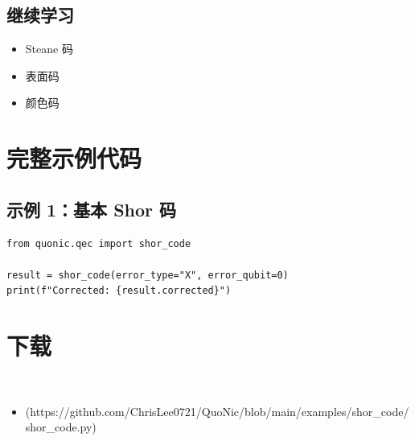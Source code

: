 \documentclass[12pt,a4paper]{article}
\begin{document}
\subsection{继续学习}
\begin{itemize}
  \item Steane 码
  \item 表面码
  \item 颜色码
\end{itemize}

\section{完整示例代码}

\subsection{示例 1：基本 Shor 码}

\begin{lstlisting}[style=python]
from quonic.qec import shor_code

result = shor_code(error_type="X", error_qubit=0)
print(f"Corrected: {result.corrected}")
\end{lstlisting}


\section{下载}

\begin{itemize}
  \item [shor_code.py](https://github.com/ChrisLee0721/QuoNic/blob/main/examples/shor_code/shor_code.py)
\end{itemize}
\end{document}
